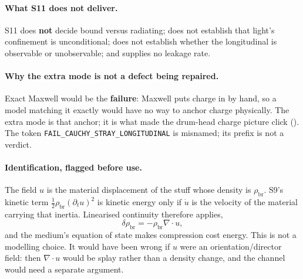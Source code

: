 \paragraph{What S11 does not deliver.}
S11 does \textbf{not} decide bound versus radiating; does not establish that
light's confinement is unconditional; does not establish whether the
longitudinal is observable or unobservable; and supplies no leakage rate.

\paragraph{Why the extra mode is not a defect being repaired.}
Exact Maxwell would be the \textbf{failure}: Maxwell puts charge in by hand, so
a model matching it exactly would have no way to anchor charge physically. The
extra mode is that anchor; it is what made the drum-head charge picture click
().
The token \texttt{FAIL\_CAUCHY\_STRAY\_LONGITUDINAL} is misnamed; its prefix is
not a verdict.

\paragraph{Identification, flagged before use.}
The field \(u\) is the material displacement of the stuff whose density is
\(\rho_{\mathrm{br}}\). S9's kinetic term
\(\tfrac12\rho_{\mathrm{br}}(\partial_tu)^2\) is kinetic energy only if
\(\dot u\) is the velocity of the material carrying that inertia. Linearised
continuity therefore applies,
\[
  \delta\rho_{\mathrm{br}}=-\rho_{\mathrm{br}}\nabla\!\cdot u,
\]
and the medium's equation of state makes compression cost energy. This is not
a modelling choice. It would have been wrong if \(u\) were an
orientation/director field: then \(\nabla\!\cdot u\) would be splay rather than
a density change, and the channel would need a separate argument.

